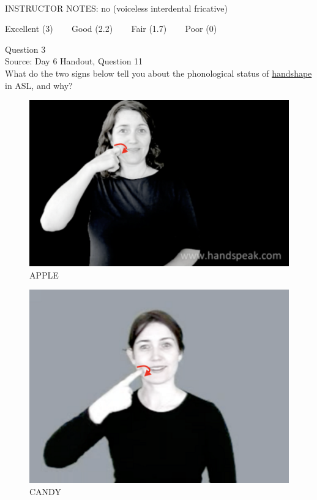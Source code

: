 \documentclass[12pt]{article}
\begin{document}
~\\
INSTRUCTOR NOTES: no (voiceless interdental fricative)


\vfill
Excellent (3) ~~~ Good (2.2) ~~~ Fair (1.7) ~~~ Poor (0)
\newpage

{\large Question 3}\\

Source: Day 6 Handout, Question 11\\

What do the two signs below tell you about the phonological status of \underline{handshape} in ASL, and why?\\

\begin{figure}[H]
\includegraphics{../images/asl_apple.png}
\caption{APPLE}
\end{figure}
\begin{figure}[H]
\includegraphics{../images/asl_candy.png}
\caption{CANDY}
\end{figure}
\end{document}
